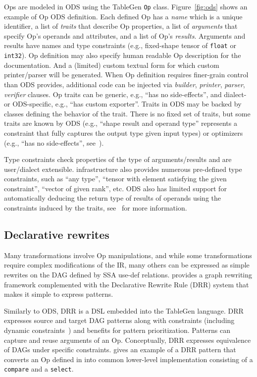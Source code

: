 Ops are modeled in ODS using the  TableGen \lstinline|Op| class.
Figure~\ref{fig:ods} shows an example of Op ODS definition.
Each defined Op has a \emph{name} which is
a unique identifier, a list of \emph{traits} that describe Op properties, a list of
\emph{arguments} that specify Op's operands and attributes, and a list of Op's \emph{results}.
Arguments and results have names and type constraints (e.g., fixed-shape tensor of
\lstinline|float| or \lstinline|int32|). Op definition may also specify
human readable Op description for the documentation.
And a (limited) custom textual form for which custom printer/parser will be generated.
When Op definition
requires finer-grain control than ODS provides, additional \Cpp code can be
injected via \emph{builder}, \emph{printer},
\emph{parser}, \emph{verifier} clauses.
Op traits can be generic, e.g., ``has no side-effects'', and
dialect- or ODS-specific, e.g., ``has custom exporter''.
Traits in ODS may be
backed by \Cpp classes defining the behavior of the trait. There is no fixed
set of traits, but some traits are known by ODS (e.g., ``shape result and
operand type'' represents a constraint that fully captures the output type given
input types) or optimizers (e.g., ``has no side-effects'',
see~).

Type constraints check properties of the type of arguments/results and are
user/dialect extensible. \MLIR infrastructure also provides numerous pre-defined
type constraints, such as ``any type'', ``tensor with element satisfying the
given constraint'', ``vector of given rank'', etc. ODS also has limited support
for automatically deducing the return type of results of operands using the
constraints induced by the traits, see~ for more information.

\subsection{Declarative rewrites}\label{sec:drr}

Many \MLIR transformations involve Op manipulations, and while some
transformations require complex modifications of the IR, many others can be
expressed as simple rewrites on the DAG defined by SSA use-def relations.  \MLIR provides a graph
rewriting framework complemented with the Declarative Rewrite Rule (DRR) system
that makes it simple to express patterns.

Similarly to ODS, DRR is a DSL embedded into the TableGen language. DRR
expresses source and target DAG patterns along with constraints (including
dynamic constraints~\cite{Thier:2018:FFI:3178372.3179501}) and
benefits for pattern prioritization. Patterns can capture and reuse arguments
of an Op.  Conceptually, DRR expresses equivalence of DAGs under specific
constraints.  gives an example of a DRR pattern that converts
an Op defined in  into common lower-level implementation consisting
of a \lstinline|compare| and a \lstinline|select|.


